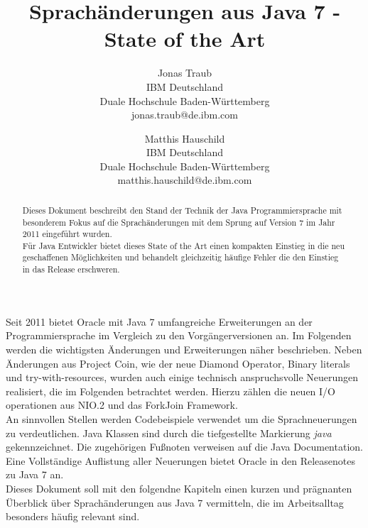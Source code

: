 \documentclass[times, 10pt,twocolumn]{article}
\begin{document}
\title{Sprachänderungen aus Java 7 - State of the Art}

\author{Jonas Traub\\
IBM Deutschland\\
Duale Hochschule Baden-Württemberg\\
jonas.traub@de.ibm.com
\and
Matthis Hauschild\\
IBM Deutschland\\
Duale Hochschule Baden-Württemberg\\
matthis.hauschild@de.ibm.com\\
}

\maketitle
\thispagestyle{empty}

\begin{abstract}
Dieses Dokument beschreibt den Stand der Technik der Java Programmiersprache mit besonderem Fokus auf die
Sprachänderungen mit dem Sprung auf Version 7 im Jahr 2011 eingeführt wurden.\\

Für Java Entwickler bietet dieses State of the Art einen kompakten Einstieg in die neu geschaffenen Möglichkeiten und
behandelt gleichzeitig häufige Fehler die den Einstieg in das Release erschweren.
\end{abstract}


Seit 2011 bietet Oracle mit Java 7 umfangreiche Erweiterungen an der Programmiersprache im Vergleich zu den Vorgängerversionen an.
Im Folgenden werden die wichtigsten Änderungen und Erweiterungen näher beschrieben. Neben Änderungen aus Project Coin,
wie der neue Diamond Operator, Binary literals und try-with-resources, wurden auch einige technisch
anspruchsvolle Neuerungen realisiert, die im Folgenden betrachtet werden. Hierzu zählen die neuen I/O operationen aus NIO.2 und
das ForkJoin Framework.\\

An sinnvollen Stellen werden Codebeispiele verwendet um die Sprachneuerungen zu verdeutlichen. Java Klassen sind durch die tiefgestellte
Markierung \textit{java} gekennzeichnet. Die zugehörigen Fußnoten verweisen auf die Java Documentation\cite{javadocs}. Eine 
Vollständige Auflistung aller Neuerungen bietet Oracle in den Releasenotes zu Java 7\cite{oracleJavaRel} an.\\

Dieses Dokument soll mit den folgendne Kapiteln einen kurzen und prägnanten Überblick über Sprachänderungen aus Java 7 vermitteln,
die im Arbeitsalltag besonders häufig relevant sind.
\end{document}
